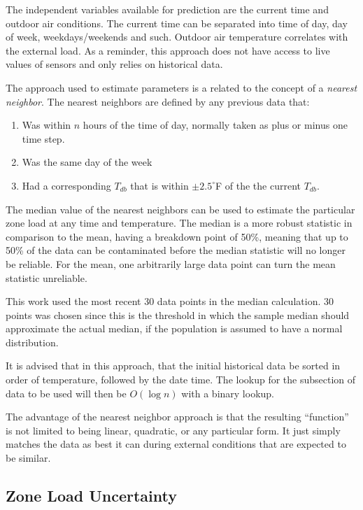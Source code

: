 The independent variables available for prediction are the current time and
outdoor air conditions. The current time can be separated into time of day, day
of week, weekdays/weekends and such. Outdoor air temperature correlates with
the external load. As a reminder, this approach does not have access to live values
of sensors and only relies on historical data.

The approach used to estimate parameters is a related to the concept of
a \textit{nearest neighbor}. The nearest neighbors are defined by any
previous data that:

\begin{enumerate}
    \item Was within \(n\) hours of the time of day, normally taken as plus or minus one time step.
\item Was the same day of the week
\item Had a corresponding \(T_{db}\) that is within \(\pm 2.5^\circ\)F of the the current \(T_{db}\).
\end{enumerate}

The median value of the nearest neighbors can be used to estimate the
particular zone load at any time and temperature.  The median is a more robust
statistic in comparison to the mean, having a breakdown point of 50\%, meaning
that up to 50\% of the data can be contaminated before the median statistic
will no longer be reliable. For the mean, one arbitrarily large data point can
turn the mean statistic unreliable.

This work used the most recent 30 data points in the median calculation. 30 points
was chosen since this is the threshold in which the sample median should approximate
the actual median, if the population is assumed to have a normal distribution.

It is advised that in this approach, that the initial historical data be sorted
in order of temperature, followed by the date time.  The lookup for the
subsection of data to be used will then be \(O\left(\log n \right)\) with a
binary lookup.

The advantage of the nearest neighbor approach is that the resulting ``function''
is not limited to being linear, quadratic, or any particular form. It just
simply matches the data as best it can during external conditions that are
expected to be similar.

\subsection{Zone Load Uncertainty}

